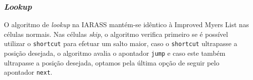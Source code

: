 \subsubsection{\textit{Lookup}}

O algoritmo de \textit{lookup} na IARASS mantém-se idêntico à Improved Myers List nas células normais. Nas células \textit{skip}, o algoritmo verifica 
primeiro se é possível utilizar o \texttt{shortcut} para efetuar um salto maior, caso o \texttt{shortcut} ultrapasse a posição desejada, o algoritmo avalia o 
apontador \texttt{jump} e caso este também ultrapasse a posição desejada, optamos pela última opção de seguir pelo apontador \texttt{next}. 
